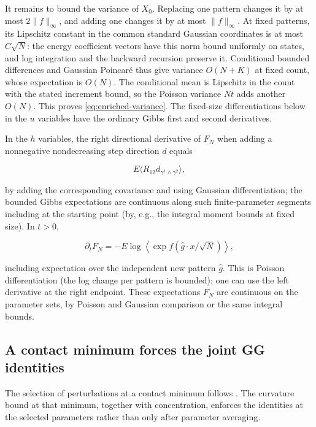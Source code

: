 \documentclass[11pt]{article}
\begin{document}
It remains to bound the variance of $X_0$. Replacing one pattern changes it by at most $2\|f\|_\infty$, and adding one changes it by at most $\|f\|_\infty$. At fixed patterns, its Lipschitz constant in the common standard Gaussian coordinates is at most $C\sqrt N$: the energy coefficient vectors have this norm bound uniformly on states, and log integration and the backward recursion preserve it. Conditional bounded differences and Gaussian Poincaré thus give variance $O(N+K)$ at fixed count, whose expectation is $O(N)$. The conditional mean is Lipschitz in the count with the stated increment bound, so the Poisson variance $Nt$ adds another $O(N)$. This proves \eqref{eq:enriched-variance}. The fixed-size differentiations below in the $u$ variables have the ordinary Gibbs first and second derivatives.

In the $h$ variables, the right directional derivative of $F_N$ when adding a nonnegative nondecreasing step direction $d$ equals

\begin{equation}\label{eq:field-derivative}
E\langle R_{12} d_{\gamma^1\wedge\gamma^2}\rangle,
\end{equation}

by adding the corresponding covariance and using Gaussian differentiation; the bounded Gibbs expectations are continuous along such finite-parameter segments including at the starting point (by, e.g., the integral moment bounds at fixed size). In $t>0$,

\begin{equation}\label{eq:density-derivative}
\partial_t F_N=-E\log\left\langle\exp f(\widehat g\cdot x/\sqrt N)\right\rangle,
\end{equation}

including expectation over the independent new pattern $\widehat g$. This is Poisson differentiation (the log change per pattern is bounded); one can use the left derivative at the right endpoint. These expectations $F_N$ are continuous on the parameter sets, by Poisson and Gaussian comparison or the same integral bounds.

\subsection{A contact minimum forces the joint GG identities}

The selection of perturbations at a contact minimum follows
\cite[proof of Theorem~4.1, Steps~1--3]{Mourrat2021Nonconvex}.
The curvature bound at that minimum, together with concentration, enforces
the identities at the selected parameters rather than only after parameter
averaging.
\end{document}
